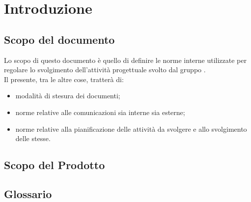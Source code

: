 \section{Introduzione}

\subsection{Scopo del documento}

Lo scopo di questo documento è quello di definire le norme interne utilizzate per regolare lo svolgimento dell'attività progettuale \ProjectName\space svolto dal gruppo \GroupName.\\
Il presente, tra le altre cose, tratterà di:
\begin{itemize}
\item modalità di stesura dei documenti;
\item norme relative alle comunicazioni sia interne sia esterne;
\item norme relative alla pianificazione delle attività da svolgere e allo svolgimento delle stesse.
\end{itemize}

\subsection{Scopo del Prodotto}
\ScopoDelProdotto

\subsection{Glossario}
\GlossarioIntroduzione






